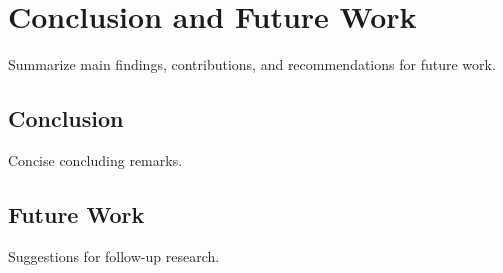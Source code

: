 \chapter{Conclusion and Future Work}
\label{ch:conclusion}

Summarize main findings, contributions, and recommendations for future work.

\section{Conclusion}
Concise concluding remarks.

\section{Future Work}
Suggestions for follow-up research.
